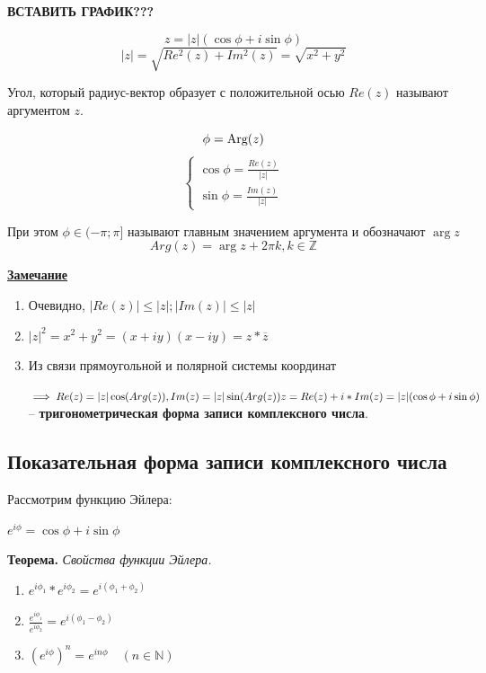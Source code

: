 \documentclass{article}
\newcommand{\parspace}{\vspace{10pt}}
\theoremstyle{break}
\begin{document}
\textbf{ВСТАВИТЬ ГРАФИК???}

\[z = |z|(\cos \phi + i \sin \phi)\]
\[|z| = \sqrt{Re^2(z) + Im^2(z)} = \sqrt{x^2 + y^2}\]

Угол, который радиус-вектор образует с положительной осью $Re(z)$
называют аргументом $z$.

\[\phi = \textnormal{Arg}(z)\]
\[
    \begin{cases}
        \cos \phi = \frac{Re(z)}{|z|} \\
        \sin \phi = \frac{Im(z)}{|z|}
    \end{cases}
\]

При этом $\phi \in (-\pi; \pi]$ называют главным значением аргумента и обозначают $\arg z$
\[Arg(z) = \arg z + 2 \pi k, k \in \mathbb{Z}\]

\parspace

\underline{\textbf{Замечание}}

\begin{enumerate}
    \item Очевидно, $|Re(z)| \le |z|; |Im(z)| \le |z|$
    \item $|z|^2 = x^2 + y^2 = (x + iy)(x - iy) = z * \overline{z}$
    \item Из связи прямоугольной и полярной системы координат 
    
    $\implies Re(z) = |z| \cos (Arg(z)), Im(z) = |z| \sin (Arg(z)) \\
    z = Re(z) + i*Im(z) = |z|(\cos \phi + i \sin \phi)$ -- \textbf{тригонометрическая
    форма записи комплексного числа}.
\end{enumerate}

\subsection{Показательная форма записи комплексного числа}

Рассмотрим функцию Эйлера:

$e^{i \phi} = \cos \phi + i \sin \phi$

\parspace

\textbf{Теорема.} \textit{Свойства функции Эйлера.}

\begin{enumerate}
    \item $e^{i \phi_1} * e^{i \phi_2} = e^{i(\phi_1 + \phi_2)}$
    \item $\frac{e^{i \phi_1}}{e^{i \phi_2}} = e^{i(\phi_1 - \phi_2)}$
    \item $(e^{i \phi})^n = e^{i n \phi} \quad (n \in \mathbb{N})$
\end{enumerate}
\end{document}

